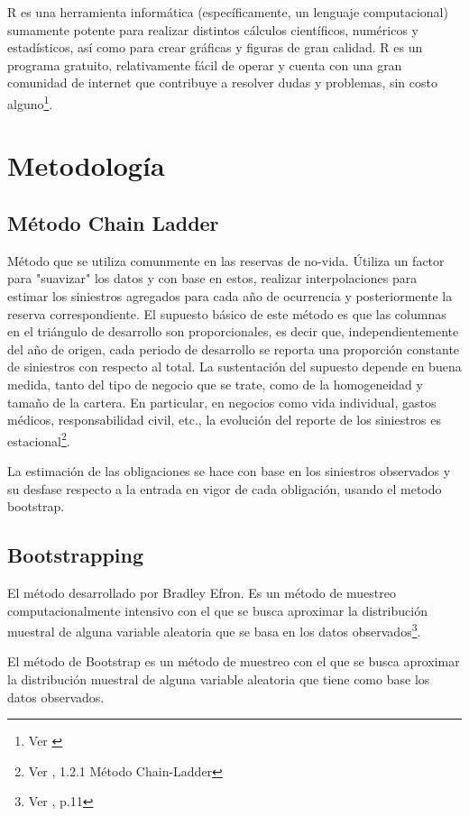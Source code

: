 \documentclass[11pt,twoside,openright,spanish]{report}
\numberwithin{equation}{chapter}
\numberwithin{figure}{chapter}
\numberwithin{table}{chapter}
\begin{document}
	R es una herramienta informática (específicamente, un lenguaje computacional) sumamente potente para realizar distintos cálculos científicos, numéricos y estadísticos, así como para crear gráficas y figuras de gran calidad. R es un programa gratuito, relativamente fácil de operar y cuenta con una gran comunidad de internet que contribuye a resolver dudas y problemas, sin costo alguno\footnote{Ver \citet{KR}}. 
	

	\chapter{Metodología}\label{tcyedb}
	
	\section{Método Chain Ladder}

	Método que se utiliza comunmente en las reservas de no-vida. Útiliza un factor para "suavizar" los datos y con base en estos, realizar interpolaciones para estimar los siniestros agregados para cada año de ocurrencia y posteriormente la reserva correspondiente. El supuesto básico de este método es que las columnas en el triángulo de desarrollo son proporcionales, es decir que, independientemente del año de origen, cada periodo de desarrollo se reporta una proporción constante de siniestros con respecto al total. La sustentación del supuesto depende en buena medida, tanto del tipo de negocio que se trate, como de la homogeneidad y tamaño de la cartera. En particular, en negocios como vida individual, gastos médicos, responsabilidad civil, etc., la evolución del reporte de los siniestros es estacional\footnote{Ver \citet{LChainLadder}, 1.2.1 Método Chain-Ladder}.  

	La estimación de las obligaciones se hace con base en los siniestros observados y su desfase respecto a la entrada en vigor de cada obligación, usando el metodo bootstrap.
	
	\section{Bootstrapping}
	El método desarrollado por Bradley Efron. Es un método de muestreo computacionalmente intensivo con el que se busca aproximar la distribución muestral de alguna variable aleatoria que se basa en los datos observados\footnote{Ver \citet{MBootstrap}, p.11}.

	El método de Bootstrap es un método de muestreo con el que se busca aproximar la distribución muestral de alguna variable aleatoria que tiene como base los datos observados.
\end{document}
